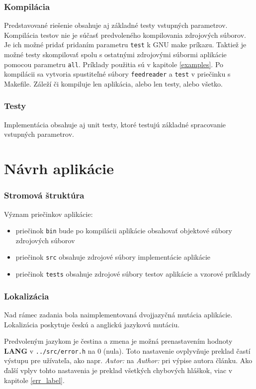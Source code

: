 \subsection*{Kompilácia}
Predstavované riešenie obsahuje aj základné testy vstupných parametrov. Kompilácia testov nie je súčasť predvoleného kompilovania zdrojových súborov. Je ich možné pridať pridaním parametru {\tt test} k GNU make príkazu. Taktiež je možné testy skompilovať spolu s ostatnými zdrojovými súbormi aplikácie pomocou parametru {\tt all}. Príklady použitia sú v kapitole \ref{examples}.
Po kompilácii sa vytvoria spustiteľné súbory {\tt feedreader} a {\tt test} v priečinku s Makefile. Záleží či kompiluje len aplikácia, alebo len testy, alebo všetko.

\subsection*{Testy}
Implementácia obsahuje aj unit testy, ktoré testujú základné spracovanie vstupných parametrov.

\chapter{Návrh aplikácie}
\subsection*{Stromová štruktúra}
\hfill \break
\noindent Význam priečinkov aplikácie:
\begin{itemize}
  \item{priečinok {\tt bin} bude po kompilácii aplikácie obsahovať objektové súbory zdrojových súborov}
  \item{priečinok {\tt src} obsahuje zdrojové súbory implementácie aplikácie}
  \item{priečinok {\tt tests} obsahuje zdrojové súbory testov aplikácie a vzorové príklady}
\end{itemize}

\subsection*{Lokalizácia}
Nad rámec zadania bola naimplementovaná dvojjazyčná mutácia aplikácie. Lokalizácia poskytuje českú a anglickú jazykovú mutáciu.

Predvoleným jazykom je čestina a zmena je možná prenastavením hodnoty \textbf{LANG} v {\tt ../src/error.h} na 0 (nula). Toto nastavenie ovplyvňuje preklad častí výstupu pre užívateľa, ako napr. {\it Autor:} na {\it Author:} pri výpise autora článku. Ako ďalší vplyv tohto nastavenia je preklad všetkých chybových hláškok, viac v kapitole \ref{err_label}.


